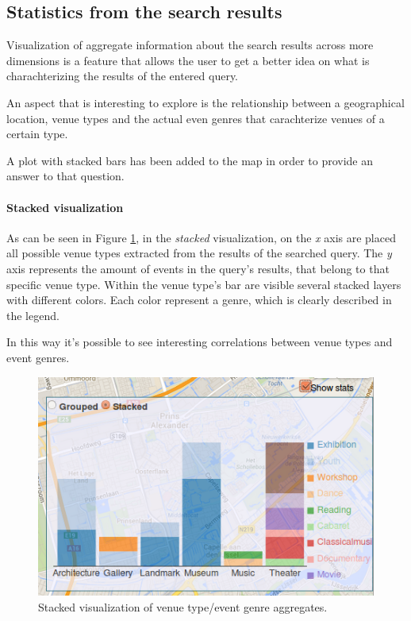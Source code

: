 \documentclass[hidelinks,a4paper]{article}
\begin{document}
\subsection{Statistics from the search results}

Visualization of aggregate information about the search results across more dimensions is a feature that allows the user to get a better idea on what is charachterizing the results of the entered query.

An aspect that is interesting to explore is the relationship
between a geographical location, 
venue types and the actual even genres that
carachterize venues of a certain type.

A plot with stacked bars has been added to the map in order
to provide an answer to that question.

\paragraph{Stacked visualization}
As can be seen in Figure \ref{fig:stats_stacked},
in the \emph{stacked} visualization, on the \textit{x} axis are placed all possible venue types
extracted from the results of the searched query.
The \textit{y} axis represents the amount of events in the query's results,
that belong to that specific venue type. Within the venue type's bar
are visible several stacked layers with different colors.
Each color represent a genre, which is clearly described in the legend.

In this way it's possible to see interesting correlations between venue types
and event genres.

\begin{figure}[h!]
  \centering
    \includegraphics[scale=0.48]{images/stats_stacked.png}    
    \caption{Stacked visualization of venue type/event genre aggregates.}
    \label{fig:stats_stacked}
\end{figure}
\end{document}
